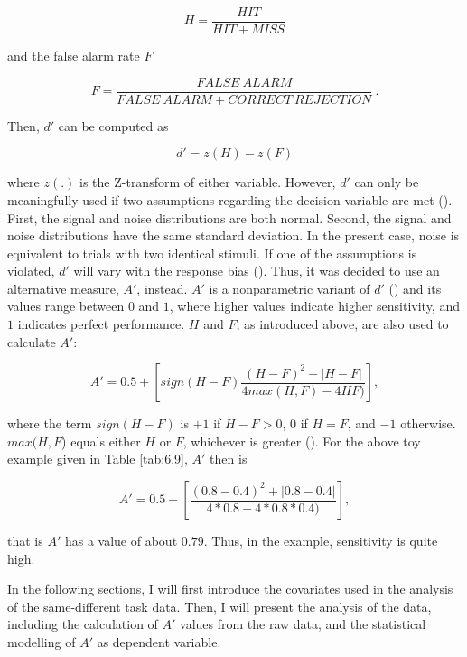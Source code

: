 \begin{equation}
\label{eq:H}
    H=\frac{HIT}{HIT+MISS}
\end{equation}

and the false alarm rate $F$

\begin{equation}
\label{eq:F}
    F=\frac{FALSE\ ALARM}{FALSE\ ALARM + CORRECT\ REJECTION}\ .
\end{equation}

Then, $d'$ can be computed as

\begin{equation}
\label{eq:dprime}
    d'=z(H)-z(F)
\end{equation}

where $z(.)$ is the Z-transform of either variable. However, $d'$ can only be meaningfully used if two assumptions regarding the decision variable are met (\cite{Stanislaw1999}). First, the signal and noise distributions are both normal. Second, the signal and noise distributions have the same standard deviation. In the present case, noise is equivalent to trials with two identical stimuli. If one of the assumptions is violated, $d'$ will vary with the response bias (\cite{Stanislaw1999}). Thus, it was decided to use an alternative measure, $A'$, instead. $A'$ is a nonparametric variant of $d'$ (\cite{Pollack1964}) and its values range between $0$ and $1$, where higher values indicate higher sensitivity, and $1$ indicates perfect performance. $H$ and $F$, as introduced above, are also used to calculate $A'$:

\begin{equation}
\label{eq:aprime}
    A'=0.5+\left [ sign(H-F)\frac{(H-F)^2+|H-F|}{4max(H,F)-4HF)}\right ],
\end{equation}

where the term $sign(H-F)$ is $+1$ if $H-F>0$, $0$ if $H=F$, and $-1$ otherwise. $max⁡(H,F$) equals either $H$ or $F$, whichever is greater (\cite{Stanislaw1999}). For the above toy example given in Table \ref{tab:6.9}, $A'$ then is

\begin{equation}
\label{eq:aprimeex}
    A'=0.5+\left [ \frac{(0.8-0.4)^2+|0.8-0.4|}{4*0.8-4*0.8*0.4)}\right ],
\end{equation}

that is $A'$ has a value of about $0.79$. Thus, in the example, sensitivity is quite high.

In the following sections, I will first introduce the covariates used in the analysis of the same-different task data. Then, I will present the analysis of the data, including the calculation of $A'$ values from the raw data, and the statistical modelling of $A'$ as dependent variable.

